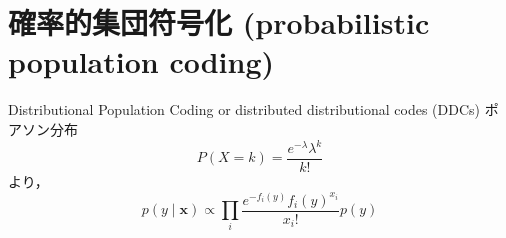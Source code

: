 \section{確率的集団符号化 (probabilistic population coding)}Distributional Population Coding or distributed distributional codes (DDCs)
ポアソン分布
$$
P(X=k)={\frac  {e^{-\lambda} \lambda^k}{k!}}
$$
より，
$$
p(y \mid \mathbf{x}) \propto \prod_{i} \frac{e^{-f_{i}(y)} f_{i}(y)^{x_{i}}}{x_{i} !} p(y)
$$